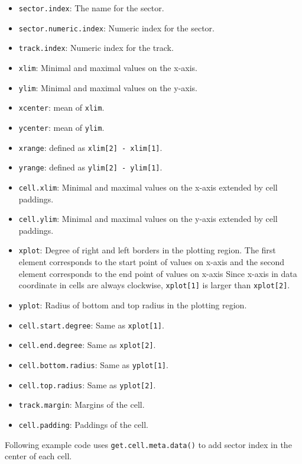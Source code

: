 \documentclass[]{book}
\providecommand{\tightlist}{%
  \setlength{\itemsep}{0pt}\setlength{\parskip}{0pt}}
\theoremstyle{definition}
\theoremstyle{definition}
\theoremstyle{remark}
\begin{document}
\begin{itemize}
\tightlist
\item
  \texttt{sector.index}: The name for the sector.
\item
  \texttt{sector.numeric.index}: Numeric index for the sector.
\item
  \texttt{track.index}: Numeric index for the track.
\item
  \texttt{xlim}: Minimal and maximal values on the x-axis.
\item
  \texttt{ylim}: Minimal and maximal values on the y-axis.
\item
  \texttt{xcenter}: mean of \texttt{xlim}.
\item
  \texttt{ycenter}: mean of \texttt{ylim}.
\item
  \texttt{xrange}: defined as \texttt{xlim{[}2{]}\ -\ xlim{[}1{]}}.
\item
  \texttt{yrange}: defined as \texttt{ylim{[}2{]}\ -\ ylim{[}1{]}}.
\item
  \texttt{cell.xlim}: Minimal and maximal values on the x-axis extended
  by cell paddings.
\item
  \texttt{cell.ylim}: Minimal and maximal values on the y-axis extended
  by cell paddings.
\item
  \texttt{xplot}: Degree of right and left borders in the plotting
  region. The first element corresponds to the start point of values on
  x-axis and the second element corresponds to the end point of values
  on x-axis Since x-axis in data coordinate in cells are always
  clockwise, \texttt{xplot{[}1{]}} is larger than \texttt{xplot{[}2{]}}.
\item
  \texttt{yplot}: Radius of bottom and top radius in the plotting
  region.
\item
  \texttt{cell.start.degree}: Same as \texttt{xplot{[}1{]}}.
\item
  \texttt{cell.end.degree}: Same as \texttt{xplot{[}2{]}}.
\item
  \texttt{cell.bottom.radius}: Same as \texttt{yplot{[}1{]}}.
\item
  \texttt{cell.top.radius}: Same as \texttt{yplot{[}2{]}}.
\item
  \texttt{track.margin}: Margins of the cell.
\item
  \texttt{cell.padding}: Paddings of the cell.
\end{itemize}

Following example code uses \texttt{get.cell.meta.data()} to add sector
index in the center of each cell.
\end{document}
